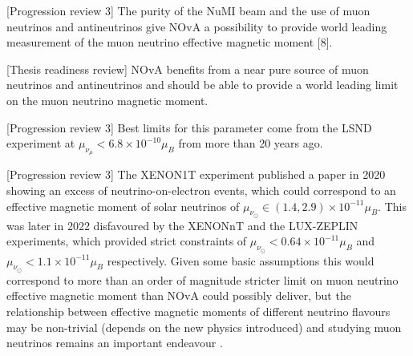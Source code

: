 

[Progression review 3] The purity of the \gls{NuMI} beam and the use of muon neutrinos and antineutrinos give NOvA a possibility to provide world leading measurement of the muon neutrino effective magnetic moment [8].

[Thesis readiness review] NOvA benefits from a near pure source of muon neutrinos and antineutrinos and should be able to provide a world leading limit on the muon neutrino magnetic moment.




[Progression review 3] Best limits \cite{PDG.pdf} for this parameter come from the LSND experiment \cite{LSNDLimits2001.pdf} at $\mu_{\nu_\mu}<6.8\times 10^{-10}\mu_B$ from more than 20 years ago. 

[Progression review 3] The XENON1T experiment published a paper \cite{XENON1TExcessNuOnE2020.pdf} in 2020 showing an excess of neutrino-on-electron events, which could correspond to an effective magnetic moment of solar neutrinos of $\mu_{\nu_\odot}\in \left(1.4, 2.9\right)\times 10^{-11} \mu_B$. This was later in 2022 disfavoured by the XENONnT \cite{XENONnTFirstResults2022.pdf} and the LUX-ZEPLIN \cite{LZNuMMResults2022.pdf} experiments, which provided strict constraints of $\mu_{\nu_\odot}<0.64\times 10^{-11}\mu_B$ and $\mu_{\nu_\odot}<1.1\times 10^{-11}\mu_B$ respectively. Given some basic assumptions \cite{BorexinoLimit2017.pdf, NuElmagInXENONnTKhan2023.pdf} this would correspond to more than an order of magnitude stricter limit on muon neutrino effective magnetic moment than NOvA could possibly deliver, but the relationship between effective magnetic moments of different neutrino flavours may be non-trivial (depends on the new physics introduced) and studying muon neutrinos remains an important endeavour \cite{LargeNuMMJointFit2022.pdf}.

